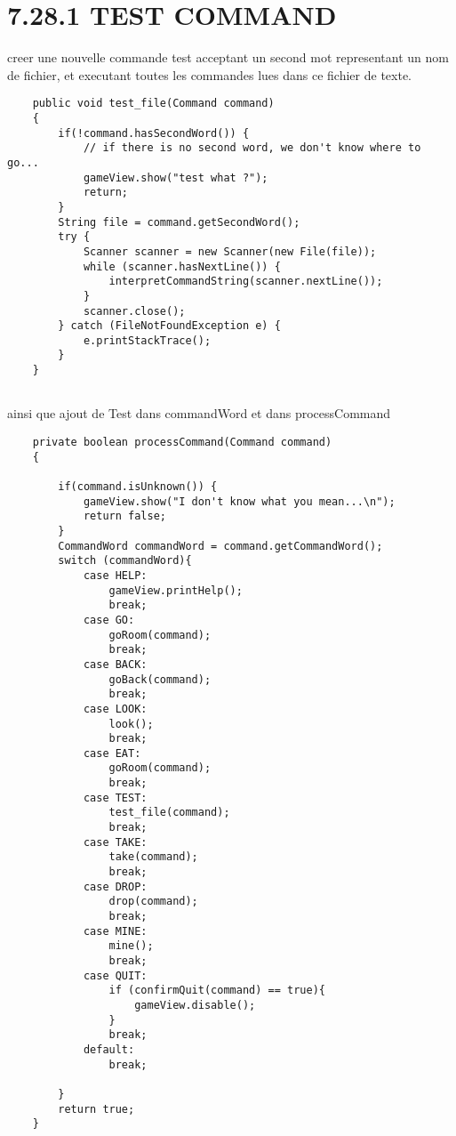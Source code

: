 \documentclass[a4paper , 10pt]{article}
\begin{document}
\section{7.28.1 TEST COMMAND}
 creer une nouvelle commande test acceptant un second mot representant un nom de fichier, et executant toutes les commandes lues dans ce fichier de texte.
\begin{verbatim}
    public void test_file(Command command)
    {
        if(!command.hasSecondWord()) {
            // if there is no second word, we don't know where to go...
            gameView.show("test what ?");
            return;
        }
        String file = command.getSecondWord();
        try {
            Scanner scanner = new Scanner(new File(file));
            while (scanner.hasNextLine()) {
                interpretCommandString(scanner.nextLine());
            }
            scanner.close();
        } catch (FileNotFoundException e) {
            e.printStackTrace();
        }
    }
    
\end{verbatim}
ainsi que ajout de Test dans commandWord et dans processCommand
\begin{verbatim}
    private boolean processCommand(Command command) 
    {

        if(command.isUnknown()) {
            gameView.show("I don't know what you mean...\n");
            return false;
        }
        CommandWord commandWord = command.getCommandWord();
        switch (commandWord){
            case HELP:
                gameView.printHelp();
                break;
            case GO:
                goRoom(command);
                break;
            case BACK:
                goBack(command);
                break;
            case LOOK:
                look();
                break;
            case EAT:
                goRoom(command);
                break;
            case TEST:
                test_file(command);
                break;
            case TAKE:
                take(command);
                break;
            case DROP:
                drop(command);
                break;
            case MINE:
                mine();
                break;
            case QUIT:
                if (confirmQuit(command) == true){
                    gameView.disable();
                }
                break;
            default:
                break;

        }
        return true;
    } 
\end{verbatim}
\end{document}
